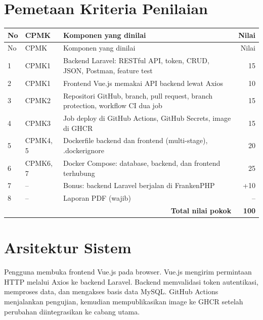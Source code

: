 \documentclass[12pt,a4paper]{report}
\begin{document}
\section{Pemetaan Kriteria Penilaian}
\begin{longtable}{p{1.0cm}p{2cm}p{8cm}r}
\toprule
No & CPMK & Komponen yang dinilai & Nilai\\\midrule\endfirsthead
\toprule No & CPMK & Komponen yang dinilai & Nilai\\\midrule\endhead
1 & CPMK1 & Backend Laravel: RESTful API, token, CRUD, JSON, Postman, feature test & 15\\
2 & CPMK1 & Frontend Vue.js memakai API backend lewat Axios & 10\\
3 & CPMK2 & Repositori GitHub, branch, pull request, branch protection, workflow CI dua job & 15\\
4 & CPMK3 & Job deploy di GitHub Actions, GitHub Secrets, image di GHCR & 15\\
5 & CPMK4, 5 & Dockerfile backend dan frontend (multi-stage), .dockerignore & 20\\
6 & CPMK6, 7 & Docker Compose: database, backend, dan frontend terhubung & 25\\
7 & -- & Bonus: backend Laravel berjalan di FrankenPHP & +10\\
8 & -- & Laporan PDF (wajib) & --\\
\midrule\multicolumn{3}{r}{\textbf{Total nilai pokok}} & \textbf{100}\\\bottomrule
\end{longtable}

\section{Arsitektur Sistem}
Pengguna membuka frontend Vue.js pada browser. Vue.js mengirim permintaan HTTP melalui Axios ke backend Laravel. Backend memvalidasi token autentikasi, memproses data, dan mengakses basis data MySQL. GitHub Actions menjalankan pengujian, kemudian mempublikasikan image ke GHCR setelah perubahan diintegrasikan ke cabang utama.
\begin{center}
\end{center}
\end{document}
